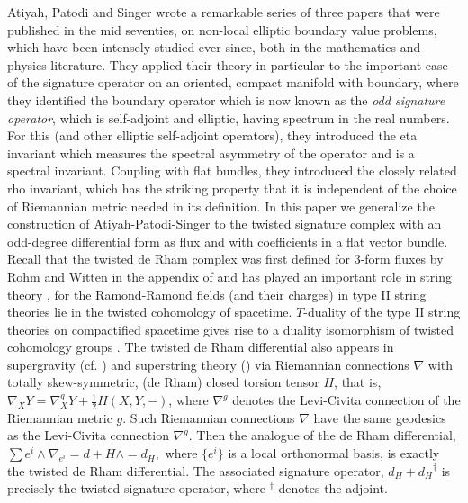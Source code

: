 \documentclass[12pt]{amsart}
\theoremstyle{plain}
\theoremstyle{definition}
\theoremstyle{remark}
\begin{document}
Atiyah, Patodi and Singer wrote a remarkable series of three papers \cite{APS1, APS2, APS3} 
that were published in the mid seventies, on non-local elliptic boundary value problems,
which have been intensely studied ever since, both in the mathematics and physics literature.
They applied their theory in particular to the important case of the signature 
operator on an oriented, compact manifold with boundary, where they identified 
the boundary operator which is now known as the {\em odd signature operator},
which is self-adjoint and elliptic, having spectrum in the real numbers. For this 
(and other elliptic self-adjoint operators), they introduced the eta invariant
which measures the spectral asymmetry of the operator and is a 
spectral invariant. Coupling with flat bundles, they introduced the closely related rho invariant,
which has the striking property that it is independent of the choice of Riemannian
metric needed in its definition. In this paper we generalize the construction of 
Atiyah-Patodi-Singer to the twisted signature complex with an odd-degree differential 
form as flux and with coefficients in a flat vector bundle.
Recall that the twisted de Rham complex was first defined for $3$-form fluxes by Rohm and
Witten in the appendix of \cite{RW} and has played an important role in string
theory \cite{BCMMS,AS}, for the Ramond-Ramond fields (and their charges) in
type II string theories lie in the twisted cohomology of spacetime.
$T$-duality of the type II string theories on compactified spacetime gives
rise to a duality isomorphism of twisted cohomology groups \cite{BEM}.
The twisted de Rham differential also appears in supergravity (cf. \cite{VanN,GHR}) and superstring theory (\cite{St86})
via Riemannian connections $\nabla$ with totally skew-symmetric, (de Rham) closed torsion tensor $H$,
that is, $\nabla_X Y = \nabla^g_X Y + \frac{1}{2} H (X, Y, -)$, where $\nabla^g$ denotes the 
Levi-Civita connection of the Riemannian metric $g$. 
Such Riemannian connections $\nabla$ have the same geodesics as the Levi-Civita connection $\nabla^g$.
Then the analogue of the de Rham 
differential, $\sum {e^i} \wedge \nabla_{e^i} = d + H\wedge = d_H,$ where $\{e^i\}$ is a local orthonormal 
basis,  is exactly the twisted de Rham differential.
The associated signature operator, $d_H + {d_H}^\dagger$ is precisely the twisted signature operator,
where ${}^\dagger$ denotes the adjoint.
\end{document}
